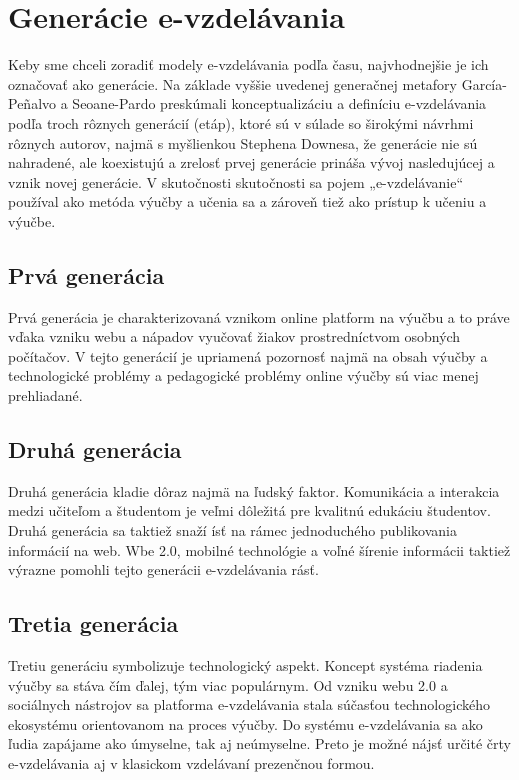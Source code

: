 \documentclass[10pt,slovak,a4paper]{article}
\begin{document}
\section{Generácie e-vzdelávania} \label{Generations}

	Keby sme chceli zoradiť modely e-vzdelávania podľa času, najvhodnejšie je ich označovať ako generácie. Na základe vyššie uvedenej generačnej metafory García-Peñalvo a Seoane-Pardo preskúmali konceptualizáciu a definíciu e-vzdelávania podľa troch rôznych generácií (etáp), ktoré sú v súlade so širokými návrhmi rôznych autorov, najmä s myšlienkou Stephena Downesa, že generácie nie sú nahradené, ale koexistujú a zrelosť prvej generácie prináša vývoj nasledujúcej a vznik novej generácie. V skutočnosti skutočnosti sa pojem „e-vzdelávanie“ používal ako metóda výučby a učenia sa a zároveň tiež ako prístup k učeniu a výučbe.
	\cite{main}

	\subsection{Prvá generácia}
	Prvá generácia je charakterizovaná vznikom online platform na výučbu a to práve vďaka vzniku webu a nápadov vyučovať žiakov prostredníctvom osobných počítačov. V tejto generácií je upriamená pozornosť najmä na obsah výučby a technologické problémy a pedagogické problémy online výučby sú viac menej prehliadané.
	\cite{main}

	\subsection{Druhá generácia}
	Druhá generácia kladie dôraz najmä na ľudský faktor. Komunikácia a interakcia medzi učiteľom a študentom je veľmi dôležitá pre kvalitnú edukáciu študentov. Druhá generácia sa taktiež snaží ísť na rámec jednoduchého publikovania informácií na web. Wbe 2.0, mobilné technológie a voľné šírenie informácii taktiež výrazne pomohli tejto generácii e-vzdelávania rásť.
	\cite{main}
	
	\subsection{Tretia generácia}
	Tretiu generáciu symbolizuje technologický aspekt. Koncept systéma riadenia výučby sa stáva čím ďalej, tým viac populárnym. Od vzniku webu 2.0 a sociálnych nástrojov sa platforma e-vzdelávania stala súčasťou technologického ekosystému orientovanom na proces výučby. Do systému e-vzdelávania sa ako ľudia zapájame ako úmyselne, tak aj neúmyselne. Preto je možné nájsť určité črty e-vzdelávania aj v klasickom vzdelávaní prezenčnou formou.
	\cite{main}
\end{document}
